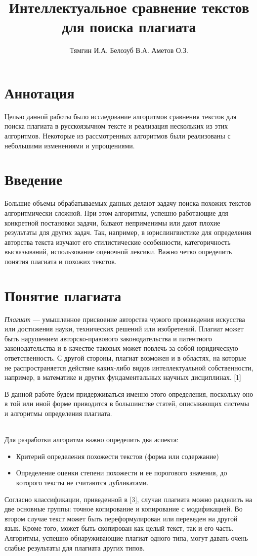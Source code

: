 \documentclass[a4paper,12pt,oneside]{article}
\title{Интеллектуальное сравнение текстов для поиска плагиата}
\author{Тямгин И.А. Белозуб В.А. Аметов О.З.}
\newcommand{\anonsection}[1]{\section*{#1}\addcontentsline{toc}{section}{#1}}
\begin{document}
\maketitle
\anonsection{Аннотация}

Целью данной работы было исследование алгоритмов сравнения текстов для поиска плагиата в русскоязычном тексте и реализация нескольких из этих алгоритмов. Некоторые из рассмотренных алгоритмов были реализованы с небольшими изменениями и упрощениями.

\anonsection{Введение}
Большие объемы обрабатываемых данных делают задачу поиска похожих текстов алгоритмически сложной. При этом алгоритмы, успешно работающие для конкретной постановки задачи, бывают неприменимы или дают плохие результаты для других задач. Так, например, в юрислингвистике для определения авторства текста изучают его стилистические особенности, категоричность высказываний, использование оценочной лексики. Важно четко определить понятия плагиата и похожих текстов.

\section{Понятие плагиата}
\textit{Плагиат} — умышленное присвоение авторства чужого произведения искусства или достижения науки, технических решений или изобретений. Плагиат может быть нарушением авторско-правового законодательства и патентного законодательства и в качестве таковых может повлечь за собой юридическую ответственность. С другой стороны, плагиат возможен и в областях, на которые не распространяется действие каких-либо видов интеллектуальной собственности, например, в математике и других фундаментальных научных дисциплинах. [1]

В данной работе будем придерживаться именно этого определения, поскольку оно в той или иной форме приводится в большинстве статей, описывающих системы и алгоритмы определения плагиата.

~\\
Для разработки алгоритма важно определить два аспекта:
\begin{itemize}
\item Критерий определения похожести текстов (форма или содержание)
\item Определение оценки степени похожести и ее порогового значения, до которого тексты не считаются дубликатами.
\end{itemize}

Согласно классификации, приведенной в [3], случаи плагиата можно разделить на две основные группы: точное копирование и копирование с модификацией. Во втором случае текст может быть переформулирован или переведен на другой язык. Кроме того, может быть скопирован как целый текст, так и его часть. Алгоритмы, успешно обнаруживающие плагиат одного типа, могут давать очень слабые результаты для плагиата других типов.
\end{document}
